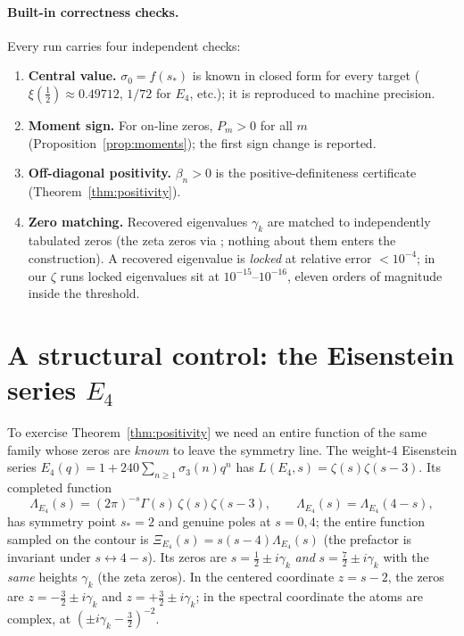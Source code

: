 \documentclass[11pt]{article}
\theoremstyle{definition}
\begin{document}
\paragraph{Built-in correctness checks.}
Every run carries four independent checks:
\begin{enumerate}
\item \textbf{Central value.} $\sigma_0=f(s_\ast)$ is known in
closed form for every target ($\xi(\tfrac12)\approx0.49712$,
$1/72$ for $E_4$, etc.); it is reproduced to machine precision.
\item \textbf{Moment sign.} For on-line zeros, $P_m>0$ for all $m$
(Proposition~\ref{prop:moments}); the first sign change is reported.
\item \textbf{Off-diagonal positivity.} $\beta_n>0$ is the
positive-definiteness certificate (Theorem~\ref{thm:positivity}).
\item \textbf{Zero matching.} Recovered eigenvalues $\gamma_k$ are
matched to independently tabulated zeros (the zeta zeros via
\cite{mpmath}; nothing about them enters the construction). A
recovered eigenvalue is \emph{locked} at relative error $<10^{-4}$;
in our $\zeta$ runs locked eigenvalues sit at $10^{-15}$--$10^{-16}$,
eleven orders of magnitude inside the threshold.
\end{enumerate}

\section{A structural control: the Eisenstein series $E_4$}\label{sec:e4}

To exercise Theorem~\ref{thm:positivity} we need an entire function
of the same family whose zeros are \emph{known} to leave the
symmetry line. The weight-4 Eisenstein series
$E_4(q)=1+240\sum_{n\ge1}\sigma_3(n)q^n$ has
$L(E_4,s)=\zeta(s)\zeta(s-3)$. Its completed function
\begin{equation}\label{eq:e4}
\Lambda_{E_4}(s)=(2\pi)^{-s}\Gamma(s)\,\zeta(s)\zeta(s-3),
\qquad
\Lambda_{E_4}(s)=\Lambda_{E_4}(4-s),
\end{equation}
has symmetry point $s_\ast=2$ and genuine poles at $s=0,4$; the
entire function sampled on the contour is
$\Xi_{E_4}(s)=s(s-4)\Lambda_{E_4}(s)$ (the prefactor is invariant
under $s\leftrightarrow 4-s$). Its zeros are
$s=\tfrac12\pm i\gamma_k$ \emph{and} $s=\tfrac72\pm i\gamma_k$ with
the \emph{same} heights $\gamma_k$ (the zeta zeros). In the centered
coordinate $z=s-2$, the zeros are
$z=-\tfrac32\pm i\gamma_k$ and $z=+\tfrac32\pm i\gamma_k$; in the
spectral coordinate the atoms are complex, at
$(\pm i\gamma_k-\tfrac32)^{-2}$.
\end{document}
